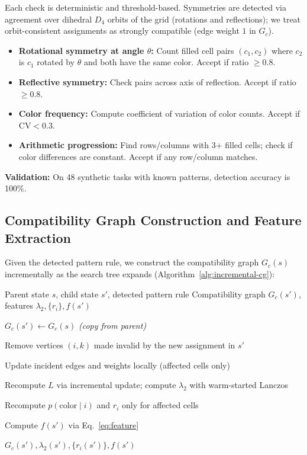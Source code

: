 \documentclass[11pt]{article}
\begin{document}
Each check is deterministic and threshold-based. Symmetries are detected via agreement over dihedral $D_4$ orbits of the grid (rotations and reflections); we treat orbit-consistent assignments as strongly compatible (edge weight $1$ in $G_c$).

\begin{itemize}
\item \textbf{Rotational symmetry at angle $\theta$:} Count filled cell pairs $(c_1, c_2)$ where $c_2$ is $c_1$ rotated by $\theta$ and both have the same color. Accept if ratio $\geq 0.8$.

\item \textbf{Reflective symmetry:} Check pairs across axis of reflection. Accept if ratio $\geq 0.8$.

\item \textbf{Color frequency:} Compute coefficient of variation of color counts. Accept if $\mathrm{CV} < 0.3$.

\item \textbf{Arithmetic progression:} Find rows/columns with 3+ filled cells; check if color differences are constant. Accept if any row/column matches.
\end{itemize}

\textbf{Validation:} On 48 synthetic tasks with known patterns, detection accuracy is 100\%.

\subsection{Compatibility Graph Construction and Feature Extraction}

Given the detected pattern rule, we construct the compatibility graph $G_c(s)$ incrementally as the search tree expands (Algorithm~\ref{alg:incremental-cg}):

\begin{algorithm}[h]
\caption{Incremental Compatibility Graph Update}
\label{alg:incremental-cg}
\begin{algorithmic}[1]
\Require Parent state $s$, child state $s'$, detected pattern rule
\Ensure Compatibility graph $G_c(s')$, features $\lambda_2, \{r_i\}, f(s')$

\State $G_c(s') \gets G_c(s)$ \quad \textit{(copy from parent)}

\State Remove vertices $(i, k)$ made invalid by the new assignment in $s'$

\State Update incident edges and weights locally (affected cells only)

\State Recompute $L$ via incremental update; compute $\lambda_2$ with warm-started Lanczos

\State Recompute $p(\text{color} \mid i)$ and $r_i$ only for affected cells

\State Compute $f(s')$ via Eq.~\ref{eq:feature}

\State \Return $G_c(s'), \lambda_2(s'), \{r_i(s')\}, f(s')$
\end{algorithmic}
\end{algorithm}
\end{document}
